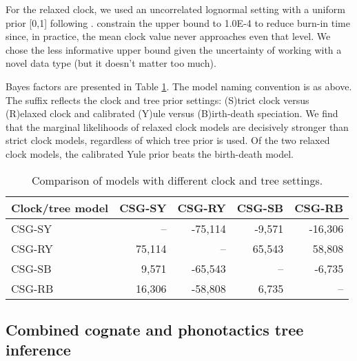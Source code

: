 \documentclass[]{article}
\begin{document}
For the relaxed clock, we used an uncorrelated lognormal setting with a uniform prior {[}0,1{]} following \textcite{kolipakam_bayesian_2018}. \textcite{bouckaert_origin_2018} constrain the upper bound to 1.0E-4 to reduce burn-in time since, in practice, the mean clock value never approaches even that level. We chose the less informative upper bound given the uncertainty of working with a novel data type (but it doesn't matter too much).

Bayes factors are presented in Table \ref{tab:tree-models}. The model naming convention is as above. The suffix reflects the clock and tree prior settings: (S)trict clock versus (R)elaxed clock and calibrated (Y)ule versus (B)irth-death speciation. We find that the marginal likelihoods of relaxed clock models are decisively stronger than strict clock models, regardless of which tree prior is used. Of the two relaxed clock models, the calibrated Yule prior beats the birth-death model.

\begin{table}

\caption{\label{tab:tree-models}Comparison of models with different clock and tree settings.}
\centering
\begin{tabular}[t]{lrrrr}
\toprule
Clock/tree model & CSG-SY & CSG-RY & CSG-SB & CSG-RB\\
\midrule
CSG-SY & -- & -75,114 & -9,571 & -16,306\\
CSG-RY & 75,114 & -- & 65,543 & 58,808\\
\addlinespace
CSG-SB & 9,571 & -65,543 & -- & -6,735\\
CSG-RB & 16,306 & -58,808 & 6,735 & --\\
\bottomrule
\end{tabular}
\end{table}

\hypertarget{pn-tree-combined}{%
\subsection{Combined cognate and phonotactics tree inference}\label{pn-tree-combined}}
\end{document}
